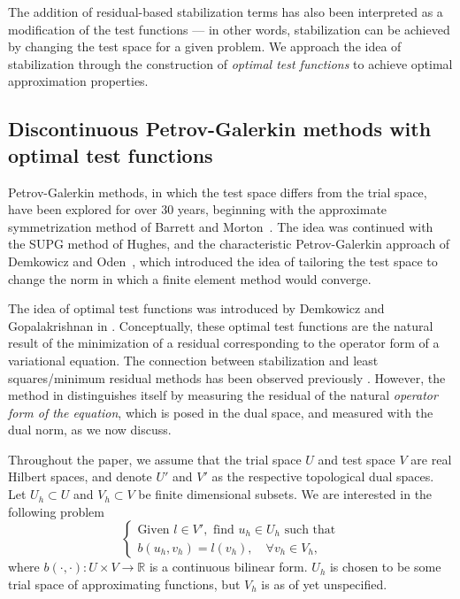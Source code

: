 \documentclass[11pt,onecolumn]{scrartcl}
\newcommand{\eqnlab}[1]{\label{eq:#1}}
\newcommand{\seclab}[1]{\label{sec:#1}}
\newcommand{\mbb}[1]{\mathbb{#1}}
\newcommand{\LRp}[1]{\left( #1 \right)}
\begin{document}
The addition of residual-based stabilization terms has also been interpreted as a modification of the test functions --- in other words, stabilization can be achieved by changing the test space for a given problem.  We approach the idea of stabilization through the construction of \textit{optimal test functions} to achieve optimal approximation properties.


\subsection{Discontinuous Petrov-Galerkin methods with optimal test functions}
\seclab{optimalTest} Petrov-Galerkin methods, in which the test space
differs from the trial space, have been explored for over 30 years,
beginning with the approximate symmetrization method of Barrett and
Morton~\cite{BARRETT01101981}. The idea was continued with the SUPG
method of Hughes, and the characteristic Petrov-Galerkin approach of
Demkowicz and Oden~\cite{Demkowicz1986188}, which introduced the
idea of tailoring the test space to change the norm in which a finite
element method would converge.

The idea of optimal test functions was introduced by Demkowicz and
Gopalakrishnan in \cite{DPG2}.  Conceptually, these optimal test
functions are the natural result of the minimization of a residual
corresponding to the operator form of a variational equation. The
connection between stabilization and least squares/minimum residual
methods has been observed previously \cite{GLS}. However, the method in \cite{DPG2} distinguishes itself
by measuring the residual of the natural \textit{operator form of the equation}, which is posed in the dual space, and measured with the dual norm, as we now discuss. 	

Throughout the paper, we assume that the trial space $U$ and test space $V$ are real Hilbert spaces, and denote $U'$ and $V'$ as the respective topological dual spaces. Let $U_h \subset U$ and $V_h\subset V$ be finite dimensional subsets. We are interested in the following problem  
\begin{equation}
\eqnlab{variationEq}
\left\{
  \begin{array}{l}
    \text{Given } l \in V', \text{ find } u_h \in U_h  \text{ such that} \\ 
    b(u_h,v_h) = l(v_h), \quad \forall v_h\in V_h,
  \end{array}
  \right.
\end{equation}
where $b\LRp{\cdot,\cdot}: U \times V \to \mbb{R}$ is a continuous
bilinear form.  $U_h$ is chosen to be some trial space of approximating functions, but $V_h$ is as of yet unspecified. 
\end{document}
